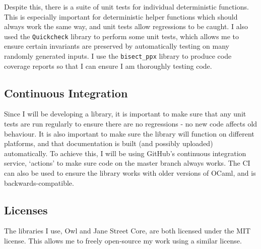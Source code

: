 Despite this, there is a suite of unit tests for individual deterministic functions. This is especially important for deterministic helper functions which should always work the same way, and unit tests allow regressions to be caught. I also used the \texttt{Quickcheck} library to perform some unit tests, which allows me to ensure certain invariants are preserved by automatically testing on many randomly generated inputs. I use the \texttt{bisect\_ppx} library to produce code coverage reports so that I can ensure I am thoroughly testing code.

\subsection{Continuous Integration}
Since I will be developing a library, it is important to make sure that any unit tests are run regularly to ensure there are no regressions - no new code affects old behaviour. It is also important to make sure the library will function on different platforms, and that documentation is built (and possibly uploaded) automatically. To achieve this, I will be using GitHub's continuous integration service, `actions' to make sure code on the master branch always works. The CI can also be used to ensure the library works with older versions of OCaml, and is backwards-compatible.
		
\subsection{Licenses}
		
The libraries I use, Owl and Jane Street Core, are both licensed under the MIT license. This allows me to freely open-source my work using a similar license.
